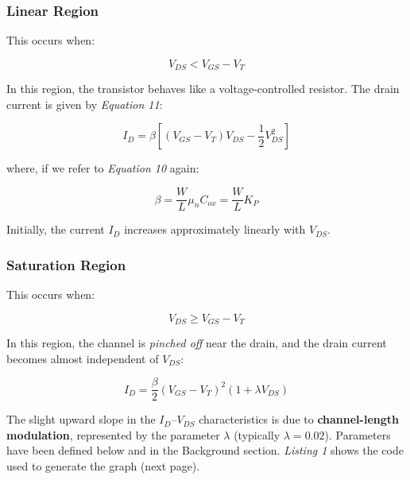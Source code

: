 \documentclass[a4paper,12pt]{article}
\begin{document}
\subsubsection*{Linear Region}
This occurs when:

\begin{equation}
V_{DS} < V_{GS} - V_T
\end{equation}

In this region, the transistor behaves like a voltage-controlled resistor. The drain current is given by \textit{Equation 11}:

\begin{equation}
I_D = \beta \left[ (V_{GS} - V_T)V_{DS} - \frac{1}{2}V_{DS}^2 \right]
\end{equation}

where, if we refer to \textit{Equation 10} again:

\[
\beta = \frac{W}{L} \mu_n C_{ox} = \frac{W}{L} K_P
\]

Initially, the current $I_D$ increases approximately linearly with $V_{DS}$.

\subsubsection*{Saturation Region}
This occurs when:

\begin{equation}
    V_{DS} \geq V_{GS} - V_T
\end{equation}

In this region, the channel is \emph{pinched off} near the drain, and the drain current becomes almost independent of $V_{DS}$:

\begin{equation}
    I_D = \frac{\beta}{2}(V_{GS} - V_T)^2(1 + \lambda V_{DS})
\end{equation}

The slight upward slope in the $I_D$--$V_{DS}$ characteristics is due to \textbf{channel-length modulation}, represented by the parameter $\lambda$ (typically $\lambda = 0.02$).
Parameters have been defined below and in the Background section. \textit{Listing 1} shows the code used to generate the graph (next page).

\newpage
\end{document}
